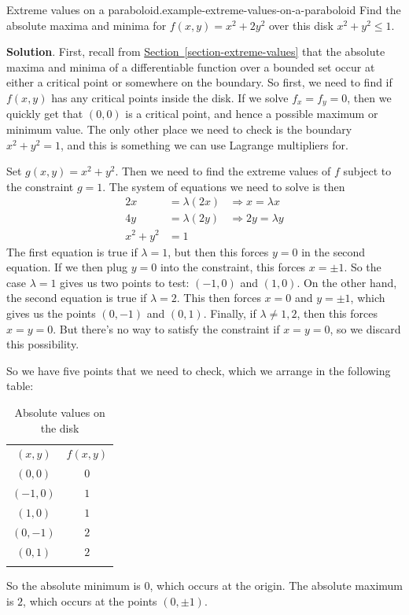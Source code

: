 \documentclass[10pt,]{book}
\numberwithin{equation}{section}
\newcommand{\hrulethin}  {\noalign{\hrule height 0.04em}}
\newcommand{\hrulethick} {\noalign{\hrule height 0.11em}}
\begin{document}
\begin{example}{Extreme values on a paraboloid.}{example-extreme-values-on-a-paraboloid}%
\hypertarget{p-1448}{}%
Find the absolute maxima and minima for \(f(x,y) = x^{2} + 2y^{2}\) over this disk \(x^{2} + y^{2} \leq 1\).%
\par\smallskip%
\noindent\textbf{Solution}.\hypertarget{solution-236}{}\quad%
\hypertarget{p-1449}{}%
First, recall from \hyperref[section-extreme-values]{Section~\ref{section-extreme-values}} that the absolute maxima and minima of a differentiable function over a bounded set occur at either a critical point or somewhere on the boundary. So first, we need to find if \(f(x,y)\) has any critical points inside the disk. If we solve \(f_{x} = f_{y} = 0\), then we quickly get that \((0,0)\) is a critical point, and hence a possible maximum or minimum value. The only other place we need to check is the boundary \(x^{2} + y^{2} = 1\), and this is something we can use Lagrange multipliers for.%
\par
\hypertarget{p-1450}{}%
Set \(g(x,y) = x^{2} + y^{2}\). Then we need to find the extreme values of \(f\) subject to the constraint \(g = 1\). The system of equations we need to solve is then%
\begin{align*}
2x & = \lambda(2x) & \Rightarrow x = \lambda x \\
4y & = \lambda(2y) & \Rightarrow 2y = \lambda y\\
x^{2} + y^{2} & = 1 
\end{align*}
The first equation is true if \(\lambda = 1\), but then this forces \(y = 0\) in the second equation. If we then plug \(y = 0\) into the constraint, this forces \(x = \pm1\). So the case \(\lambda=1\) gives us two points to test: \((-1,0)\) and \((1,0)\). On the other hand, the second equation is true if \(\lambda = 2\). This then forces \(x = 0\) and \(y = \pm 1\), which gives us the points \((0,-1)\) and \((0,1)\). Finally, if \(\lambda\neq1,2\), then this forces \(x = y = 0\). But there's no way to satisfy the constraint if \(x = y = 0\), so we discard this possibility.%
\par
\hypertarget{p-1451}{}%
So we have five points that we need to check, which we arrange in the following table: \leavevmode%
\begin{table}
\centering
\begin{tabular}{cc}\hrulethick
\((x,y)\)&\(f(x,y)\)\tabularnewline\hrulethin
\((0,0)\)&\(0\)\tabularnewline[0pt]
\((-1,0)\)&\(1\)\tabularnewline[0pt]
\((1,0)\)&\(1\)\tabularnewline[0pt]
\((0,-1)\)&\(2\)\tabularnewline[0pt]
\((0,1)\)&\(2\)\tabularnewline\hrulethick
\end{tabular}
\caption{Absolute values on the disk\label{table-lagrange-example-2}}
\end{table}
 So the absolute minimum is \(0\), which occurs at the origin. The absolute maximum is \(2\), which occurs at the points \((0,\pm1)\).%
\end{example}
\end{document}
